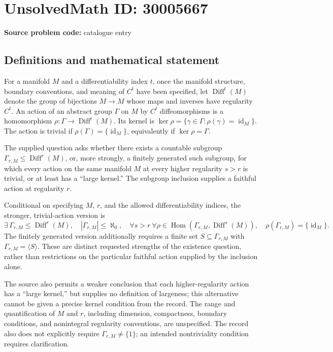 \documentclass[11pt]{article}
\begin{document}
\section*{UnsolvedMath ID: 30005667}
\textbf{Source problem code:} catalogue entry
\subsection{Definitions and mathematical statement}
For a manifold \(M\) and a differentiability index \(t\), once the manifold structure, boundary conventions, and meaning of \(C^t\) have been specified, let \(\operatorname{Diff}^t(M)\) denote the group of bijections \(M\to M\) whose maps and inverses have regularity \(C^t\). An action of an abstract group \(\Gamma\) on \(M\) by \(C^t\) diffeomorphisms is a homomorphism \(\rho:\Gamma\to\operatorname{Diff}^t(M)\). Its kernel is \(\ker\rho=\{\gamma\in\Gamma:\rho(\gamma)=\operatorname{id}_M\}\). The action is trivial if \(\rho(\Gamma)=\{\operatorname{id}_M\}\), equivalently if \(\ker\rho=\Gamma\).

The supplied question asks whether there exists a countable subgroup \(\Gamma_{r,M}\leq\operatorname{Diff}^r(M)\), or, more strongly, a finitely generated such subgroup, for which every action on the same manifold \(M\) at every higher regularity \(s>r\) is trivial, or at least has a ``large kernel.'' The subgroup inclusion supplies a faithful action at regularity \(r\).

Conditional on specifying \(M\), \(r\), and the allowed differentiability indices, the stronger, trivial-action version is
\[
\exists\,\Gamma_{r,M}\leq\operatorname{Diff}^r(M),\quad
|\Gamma_{r,M}|\leq\aleph_0,\quad
\forall s>r\ \forall\rho\in\operatorname{Hom}\!\left(\Gamma_{r,M},\operatorname{Diff}^s(M)\right),\quad
\rho(\Gamma_{r,M})=\{\operatorname{id}_M\}.
\]
The finitely generated version additionally requires a finite set \(S\subseteq\Gamma_{r,M}\) with \(\Gamma_{r,M}=\langle S\rangle\). These are distinct requested strengths of the existence question, rather than restrictions on the particular faithful action supplied by the inclusion alone.

The source also permits a weaker conclusion that each higher-regularity action has a ``large kernel,'' but supplies no definition of largeness; this alternative cannot be given a precise kernel condition from the record. The range and quantification of \(M\) and \(r\), including dimension, compactness, boundary conditions, and nonintegral regularity conventions, are unspecified. The record also does not explicitly require \(\Gamma_{r,M}\neq\{1\}\); an intended nontriviality condition requires clarification.
\end{document}
